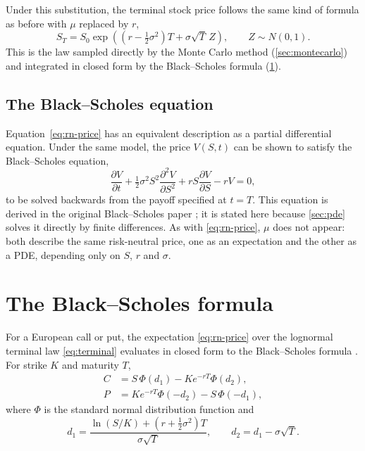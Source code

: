 \documentclass[11pt,a4paper]{article}
\numberwithin{equation}{section}
\theoremstyle{definition}
\theoremstyle{plain}
\theoremstyle{remark}
\begin{document}
Under this substitution, the terminal stock price follows the same kind of
formula as before with $\mu$ replaced by $r$,
\begin{equation}\label{eq:terminal}
  S_T = S_0 \exp\!\left( \left(r - \tfrac{1}{2}\sigma^2\right)T
        + \sigma\sqrt{T}\,Z \right), \qquad Z \sim N(0,1).
\end{equation}
This is the law sampled directly by the Monte Carlo method (\cref{sec:montecarlo})
and integrated in closed form by the Black--Scholes formula (\cref{sec:analytic}).

\subsection{The Black--Scholes equation}

Equation~\eqref{eq:rn-price} has an equivalent description as a partial
differential equation. Under the same model, the price $V(S,t)$ can be shown
to satisfy the Black--Scholes equation,
\begin{equation}\label{eq:bspde}
  \frac{\partial V}{\partial t}
  + \tfrac{1}{2}\sigma^2 S^2 \frac{\partial^2 V}{\partial S^2}
  + r S \frac{\partial V}{\partial S} - rV = 0,
\end{equation}
to be solved backwards from the payoff specified at $t = T$. This equation is
derived in the original Black--Scholes paper \cite{blackscholes}; it is stated
here because \cref{sec:pde} solves it directly
by finite differences. As with \eqref{eq:rn-price}, $\mu$ does not appear:
both describe the same risk-neutral price, one as an expectation and the other
as a PDE, depending only on $S$, $r$ and $\sigma$.

\clearpage
\section{The Black--Scholes formula}\label{sec:analytic}

For a European call or put, the expectation \eqref{eq:rn-price} over the
lognormal terminal law \eqref{eq:terminal} evaluates in closed form to the
Black--Scholes formula \cite{blackscholes}. For strike $K$ and maturity
$T$,
\begin{align}
  C &= S\,\Phi(d_1) - K e^{-rT}\Phi(d_2), \label{eq:bscall}\\
  P &= K e^{-rT}\Phi(-d_2) - S\,\Phi(-d_1), \label{eq:bsput}
\end{align}
where $\Phi$ is the standard normal distribution function and
\begin{equation}\label{eq:d1d2}
  d_1 = \frac{\ln(S/K) + \left(r + \tfrac{1}{2}\sigma^2\right)T}{\sigma\sqrt{T}},
  \qquad
  d_2 = d_1 - \sigma\sqrt{T}.
\end{equation}
\end{document}
